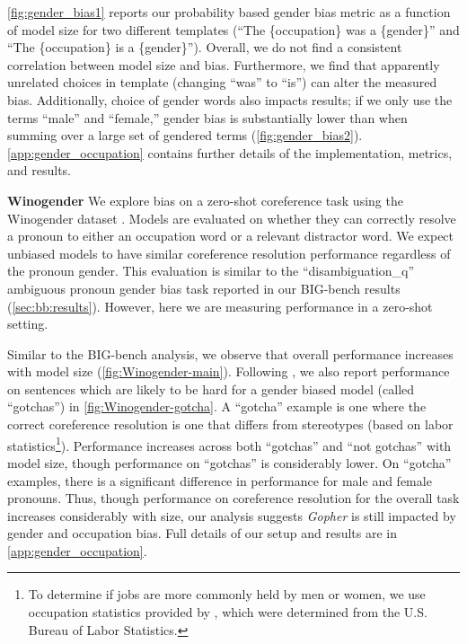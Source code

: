 \autoref{fig:gender_bias1} reports our probability based gender bias metric as a function of model size for two different templates (``The \{occupation\} was a \{gender\}'' and ``The \{occupation\} is a \{gender\}'').
Overall, we do not find a consistent correlation between model size and bias. Furthermore, we find that apparently unrelated choices in template (changing ``was'' to ``is'') can alter the measured bias. Additionally, choice of gender words also impacts results; if we only use the terms ``male'' and ``female,'' gender bias is substantially lower than when summing over a large set of gendered terms (\autoref{fig:gender_bias2}). \autoref{app:gender_occupation} contains further details of the implementation, metrics, and results.

\textbf{Winogender} 
We explore bias on a zero-shot coreference task using the Winogender dataset \citep{rudinger2018gender}. Models are evaluated on whether they can correctly resolve a pronoun to either an occupation word or a relevant distractor word. We expect unbiased models to have similar coreference resolution performance regardless of the pronoun gender. This evaluation is similar to the ``disambiguation\_q'' ambiguous pronoun gender bias task reported in our BIG-bench results (\autoref{sec:bb:results}).
However, here we are measuring performance in a zero-shot setting.

Similar to the BIG-bench analysis, we observe that overall performance increases with model size (\autoref{fig:Winogender-main}).
Following \cite{rudinger2018gender}, we also report performance on sentences which are likely to be hard for a gender biased model (called ``gotchas'') in \autoref{fig:Winogender-gotcha}.
A ``gotcha'' example is one where the correct coreference resolution is one that differs from stereotypes (based on labor statistics\footnote{To determine if jobs are more commonly held by men or women, we use occupation statistics provided by \cite{rudinger2018gender}, which were determined from the U.S. Bureau of Labor Statistics.}). Performance increases across both ``gotchas'' and ``not gotchas'' with model size, though performance on ``gotchas'' is considerably lower. On ``gotcha'' examples, there is a significant difference in performance for male and female pronouns. Thus, though performance on coreference resolution for the overall task increases considerably with size, our analysis suggests \textit{Gopher} is still impacted by gender and occupation bias. Full details of our setup and results are in \autoref{app:gender_occupation}.

